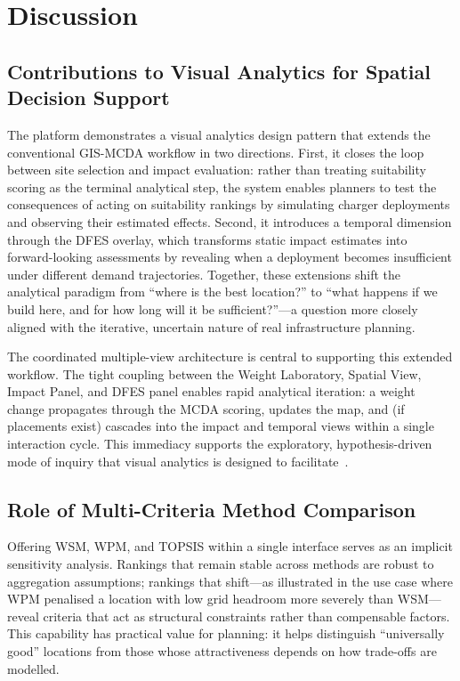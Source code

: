 
\section{Discussion}
\label{sec:discussion}

\subsection{Contributions to Visual Analytics for Spatial Decision Support}
\label{sec:disc-va}

The platform demonstrates a visual analytics design pattern that extends the conventional GIS-MCDA workflow in two directions. First, it closes the loop between site selection and impact evaluation: rather than treating suitability scoring as the terminal analytical step, the system enables planners to test the consequences of acting on suitability rankings by simulating charger deployments and observing their estimated effects. Second, it introduces a temporal dimension through the DFES overlay, which transforms static impact estimates into forward-looking assessments by revealing when a deployment becomes insufficient under different demand trajectories. Together, these extensions shift the analytical paradigm from ``where is the best location?'' to ``what happens if we build here, and for how long will it be sufficient?''---a question more closely aligned with the iterative, uncertain nature of real infrastructure planning.

The coordinated multiple-view architecture is central to supporting this extended workflow. The tight coupling between the Weight Laboratory, Spatial View, Impact Panel, and DFES panel enables rapid analytical iteration: a weight change propagates through the MCDA scoring, updates the map, and (if placements exist) cascades into the impact and temporal views within a single interaction cycle. This immediacy supports the exploratory, hypothesis-driven mode of inquiry that visual analytics is designed to facilitate~\cite{keim2008visual}.

\subsection{Role of Multi-Criteria Method Comparison}
\label{sec:disc-methods}

Offering WSM, WPM, and TOPSIS within a single interface serves as an implicit sensitivity analysis. Rankings that remain stable across methods are robust to aggregation assumptions; rankings that shift---as illustrated in the use case where WPM penalised a location with low grid headroom more severely than WSM---reveal criteria that act as structural constraints rather than compensable factors. This capability has practical value for planning: it helps distinguish ``universally good'' locations from those whose attractiveness depends on how trade-offs are modelled.

